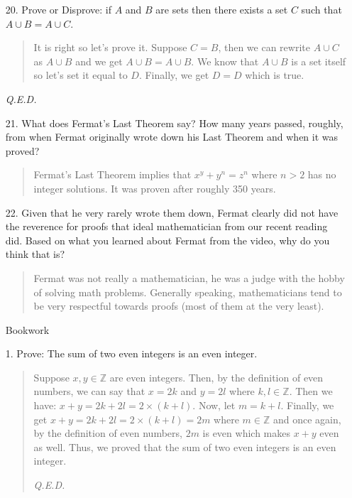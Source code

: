 \documentclass[12pt, a4paper]{article}                      %
\begin{document}
\begin{enumerate}
\item[20.]
Prove or Disprove: if $A$ and $B$ are sets then there exists a set $C$ such that $A \cup B = A \cup C$.
\begin{quote}
It is right so let's prove it.
Suppose $C = B$, then we can rewrite $A \cup C$ as $A \cup B$ and we get $A \cup B = A \cup B$.
We know that $A \cup B$ is a set itself so let's set it equal to $D$. Finally, we get $D = D$ which
is true.
\end{quote}
\begin{flushright}
\textit{Q.E.D.}
\end{flushright}

\item[21.]
What does Fermat’s Last Theorem say? How many years passed, roughly, from when
Fermat originally wrote down his Last Theorem and when it was proved?
\begin{quote}
Fermat's Last Theorem implies that $x^y + y^n = z^n$ where $n > 2$ has no integer solutions.
It was proven after roughly 350 years.
\end{quote}

\item[22.]
Given that he very rarely wrote them down, Fermat clearly did not have the reverence
for proofs that ideal mathematician from our recent reading did. Based on what you
learned about Fermat from the video, why do you think that is?
\begin{quote}
Fermat was not really a mathematician, he was a judge with the hobby of solving math problems.
Generally speaking, mathematicians tend to be very respectful towards proofs (most of
them at the very least).
\end{quote}

\newpage
{\Large Bookwork}
\item[1.]
Prove: The sum of two even integers is an even integer.
\begin{quote}
Suppose $x, y \in \mathbb{Z}$ are even integers. Then, by the definition of even
numbers, we can say that $x = 2k$ and $y = 2l$ where $k, l \in \mathbb{Z}$.
Then we have: $x + y = 2k + 2l = 2 \times (k + l)$. Now, let $m = k + l$.
Finally, we get $x + y = 2k + 2l = 2 \times (k + l) = 2m$ where $m \in \mathbb{Z}$
and once again, by the definition of even numbers, $2m$ is even which makes $x + y$ even as well.
Thus, we proved that the sum of two even integers is an even integer.
\begin{flushright}
\textit{Q.E.D.}
\end{flushright}
\end{quote}


\end{enumerate}
\end{document}
